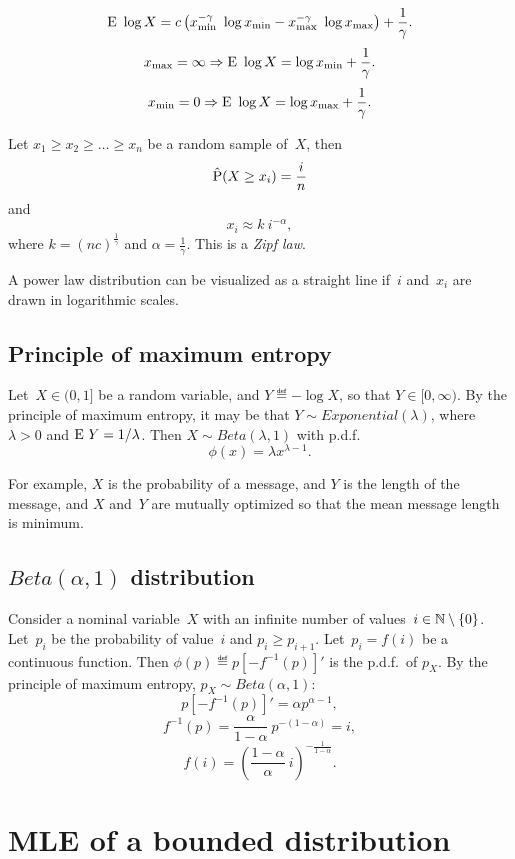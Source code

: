 \documentclass[10pt,a4paper]{article}
\theoremstyle{plain} \newtheorem{Lem}{Lemma}
\begin{document}
$$ \E \log X
= c \left(  x_{\mathrm {min}}^{-\gamma} \ \log x_{\mathrm {min}}
- x_{\mathrm {max}}^{-\gamma} \ \log x_{\mathrm {max}}
\right)
+ \frac 1 \gamma.
$$
$$ x_{\mathrm {max}} = \infty \implies \E \log X = \log x_{\mathrm {min}} + \frac 1 \gamma. $$
$$ x_{\mathrm {min}} = 0      \implies \E \log X = \log x_{\mathrm {max}} + \frac 1 \gamma. $$

Let $x_1 \ge x_2 \ge \dots \ge x_n$ be a random sample of~$X$,
then
$$ \hat \P(X \ge x_i) = \frac i n $$
and
$$ x_i \approx  k \ i^{- \alpha}, $$
where $k = (nc)^{\frac 1 \gamma}$ and $\alpha = \frac 1 \gamma$.
This is a {\em Zipf law}.

A power law distribution can be visualized as a straight line
if~$i$ and~$x_i$ are drawn in logarithmic scales.



\subsection{Principle of maximum entropy}

Let~$X \in (0,1]$ be a random variable, and $Y \eqdef - \log X$, so that $Y \in [0,\infty)$.
By the principle of maximum entropy, it may be that $Y \sim Exponential(\lambda)$, where $\lambda > 0$ and $\E Y = 1/\lambda$.
Then $X \sim Beta(\lambda,1)$ with p.d.f.
$$ \phi(x) = \lambda x^{\lambda - 1}. $$


For example, $X$ is the probability of a message, and $Y$ is the length of the message,
and $X$ and~$Y$ are mutually optimized so that the mean message length is minimum.


\subsection{$Beta(\alpha,1)$ distribution}

Consider a nominal variable~$X$ with an infinite number of values~$i \in \N \setminus \{0\}$.
Let~$p_i$ be the probability of value~$i$ and $p_i \ge p_{i+1}$.
Let~$p_i=f(i)$ be a continuous function.
Then $\phi(p) \eqdef p [- f^{-1}(p)]'$ is the p.d.f.~of $p_X$.
By the principle of maximum entropy, $p_X \sim Beta(\alpha,1)$:
$$ p [- f^{-1}(p)]' = \alpha p^{\alpha - 1}, $$
$$ f^{-1}(p) = \frac \alpha {1 - \alpha} \ p^{-(1-\alpha)} = i, $$
$$ f(i) = \left(\frac {1-\alpha} \alpha \ i \right)^{-\frac 1 {1-\alpha}}. $$




\section{MLE of a bounded distribution}
\end{document}
